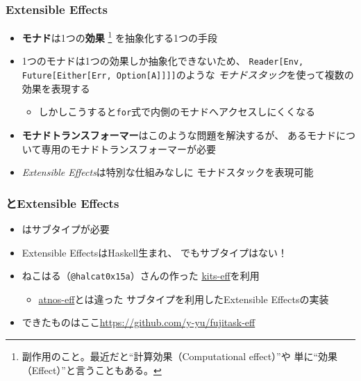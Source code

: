 \begin{frame}
  \frametitle{Extensible Effects}

  \pause
  \begin{itemize}
    \item<+-> \textbf{モナド}は1つの\textbf{効果}%
    \footnote[frame]{副作用のこと。最近だと``計算効果（Computational effect）''や%
      単に``効果（Effect）''と言うこともある。}%
    を抽象化する1つの手段

    \item<+-> 1つのモナドは1つの効果しか抽象化できないため、
    \lstinline|Reader[Env, Future[Either[Err, Option[A]]]]|のような
    \emph{モナドスタック}を使って複数の効果を表現する
    \begin{itemize}
      \item<+-> しかしこうすると\lstinline|for|式で内側のモナドへアクセスしにくくなる
    \end{itemize}

    \item<+-> \textbf{モナドトランスフォーマー}はこのような問題を解決するが、
    あるモナドについて専用のモナドトランスフォーマーが必要

    \item<+-> \emph{Extensible Effects}は特別な仕組みなしに
    モナドスタックを表現可能
  \end{itemize}
\end{frame}

\begin{frame}
  \frametitle{\Fujitask とExtensible Effects}

  \begin{itemize}
    \item<+-> \Fujitask はサブタイプが必要

    \item<+-> Extensible EffectsはHaskell生まれ、
    でもサブタイプはない！
  \end{itemize}


  \begin{itemize}
    \item<+-> ねこはる（\texttt{@halcat0x15a}）さんの作った
    \href{https://github.com/halcat0x15a/kits-eff}{kits-eff}を利用
    \begin{itemize}
      \item \href{https://github.com/atnos-org/eff}{atnos-eff}とは違った
      サブタイプを利用したExtensible Effectsの実装
    \end{itemize}

    \item<+-> できたものはここ\url{https://github.com/y-yu/fujitask-eff}
  \end{itemize}
\end{frame}

